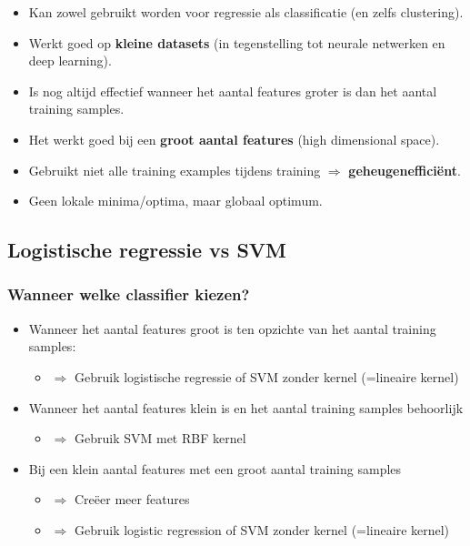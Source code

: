 \documentclass{article}
\begin{document}
\begin{itemize}
    \item Kan zowel gebruikt worden voor regressie als classificatie (en zelfs clustering).
    \item Werkt goed op \textbf{kleine datasets} (in tegenstelling tot neurale netwerken en deep learning).
    \item Is nog altijd effectief wanneer het aantal features groter is dan het aantal training samples.
    \item Het werkt goed bij een \textbf{groot aantal features} (high dimensional space).
    \item Gebruikt niet alle training examples tijdens training $\Rightarrow$ \textbf{geheugenefficiënt}.
    \item Geen lokale minima/optima, maar globaal optimum.
\end{itemize}

\subsection{Logistische regressie vs SVM}

\subsubsection{Wanneer welke classifier kiezen?}

\begin{itemize}
    \item Wanneer het aantal features groot is ten opzichte van het aantal training samples:
    \begin{itemize}
        \item $\Rightarrow$ Gebruik logistische regressie of SVM zonder kernel (=lineaire kernel)
    \end{itemize}
    \item Wanneer het aantal features klein is en het aantal training samples behoorlijk
    \begin{itemize}
        \item $\Rightarrow$ Gebruik SVM met RBF kernel
    \end{itemize} 
    \item Bij een klein aantal features met een groot aantal training samples
    \begin{itemize}
        \item $\Rightarrow$ Creëer meer features
        \item $\Rightarrow$ Gebruik logistic regression of SVM zonder kernel (=lineaire kernel)
    \end{itemize} 
\end{itemize}
\end{document}
